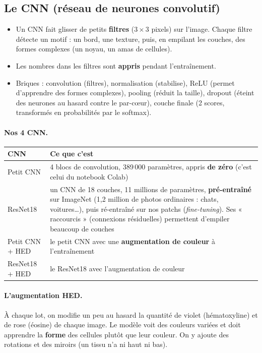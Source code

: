 \documentclass[11pt,a4paper]{article}
\begin{document}
\subsection{Le CNN (réseau de neurones convolutif)}
\begin{itemize}
  \item Un CNN fait glisser de petits \textbf{filtres} ($3\times3$ pixels) sur l'image. Chaque filtre détecte un motif : un bord,
        une texture, puis, en empilant les couches, des formes complexes (un noyau, un amas de cellules).
  \item Les nombres dans les filtres sont \textbf{appris} pendant l'entraînement.
  \item Briques : convolution (filtres), normalisation (stabilise), ReLU (permet d'apprendre des formes complexes), pooling (réduit la
        taille), dropout (éteint des neurones au hasard contre le par-cœur), couche finale (2 scores, transformés en probabilités par
        le softmax).
\end{itemize}

\paragraph{Nos 4 CNN.}
\begin{table}[H]
\centering\small
\begin{tabularx}{\textwidth}{lX}
\toprule
\textbf{CNN} & \textbf{Ce que c'est} \\
\midrule
Petit CNN & 4 blocs de convolution, 389\,000 paramètres, appris \textbf{de zéro} (c'est celui du notebook Colab) \\
ResNet18 & un CNN de 18 couches, 11 millions de paramètres, \textbf{pré-entraîné} sur ImageNet (1,2 million de photos ordinaires :
chats, voitures\dots), puis ré-entraîné sur nos patchs (\emph{fine-tuning}). Ses « raccourcis » (connexions résiduelles) permettent
d'empiler beaucoup de couches \\
Petit CNN + HED & le petit CNN avec une \textbf{augmentation de couleur} à l'entraînement \\
ResNet18 + HED & le ResNet18 avec l'augmentation de couleur \\
\bottomrule
\end{tabularx}
\end{table}

\paragraph{L'augmentation HED.} À chaque lot, on modifie un peu au hasard la quantité de violet (hématoxyline) et de rose (éosine)
de chaque image. Le modèle voit des couleurs variées et doit apprendre la \textbf{forme} des cellules plutôt que leur couleur. On y
ajoute des rotations et des miroirs (un tissu n'a ni haut ni bas).
\end{document}
